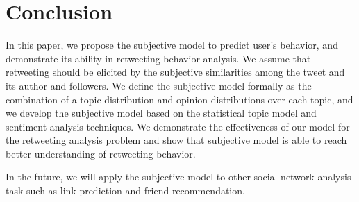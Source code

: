 \documentclass[letterpaper]{article}
\begin{document}
\section{Conclusion}
In this paper, we propose the subjective model to predict user's behavior, and demonstrate its ability in retweeting behavior analysis. We assume that retweeting should be elicited by the subjective similarities among the tweet and its author and followers. 
We define the subjective model formally as the combination of a topic distribution and opinion distributions over each topic, and we develop the subjective model based on the statistical topic model and sentiment analysis techniques.
We demonstrate the effectiveness of our model for the retweeting analysis problem and show that subjective model is able to reach better understanding of retweeting behavior. 

In the future, we will apply the subjective model to other social network analysis task such as link prediction and friend recommendation. 



\end{document}
